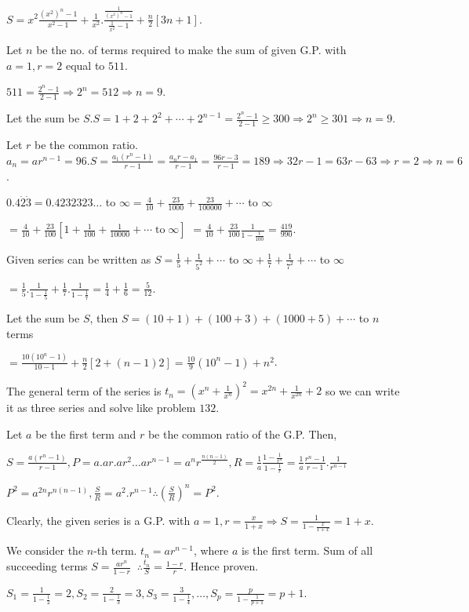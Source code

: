  $S = x^2\frac{(x^2)^n - 1}{x^2 - 1} + \frac{1}{x^2}.\frac{\frac{1}{(x^2)^n - 1}}{\frac{1}{x^2} - 1}
  + \frac{n}{2}[3n + 1]$.
\item Let $n$ be the no. of terms required to make the sum of given G.P. with $a = 1, r = 2$ equal to $511$.

  $511 = \frac{2^n - 1}{2 - 1} \Rightarrow 2^n = 512 \Rightarrow n = 9$.
\item Let the sum be $S. S = 1 + 2 + 2^2 + \cdots + 2^{n - 1} = \frac{2^n - 1}{2 - 1}\geq 300 \Rightarrow
  2^n\geq 301 \Rightarrow n = 9$.
\item Let $r$ be the common ratio. $a_n = ar^{n - 1} = 96. S = \frac{a_1(r^n - 1)}{r - 1} = \frac{a_nr -
  a_1}{r - 1} = \frac{96r - 3}{r - 1} = 189 \Rightarrow 32r - 1 = 63r - 63 \Rightarrow r = 2 \Rightarrow n =
  6$.
\item $0.4\dot{2}\dot{3} = 0.4232323\ldots$ to $\infty = \frac{4}{10} + \frac{23}{1000} + \frac{23}{100000}
  + \cdots$ to $\infty$

  $= \frac{4}{10} + \frac{23}{100}\left[1 + \frac{1}{100} + \frac{1}{10000} +
    \cdots\mathrm{\;to\;}\infty\right]$
  $= \frac{4}{10} + \frac{23}{100}\frac{1}{1 - \frac{1}{100}} = \frac{419}{990}$.
\item Given series can be written as $S = \frac{1}{5} + \frac{1}{5^2} + \cdots$ to $\infty + \frac{1}{7} +
  \frac{1}{7^2} + \cdots $ to $\infty$

  $= \frac{1}{5}.\frac{1}{1 - \frac{1}{5}} + \frac{1}{7}.\frac{1}{1 - \frac{1}{7}} = \frac{1}{4} +
  \frac{1}{6} = \frac{5}{12}$.
\item Let the sum be $S$, then $S = (10 + 1) + (100 + 3) + (1000 + 5) + \cdots$ to $n$ terms

  $= \frac{10(10^n - 1)}{10 - 1} + \frac{n}{2}[2 + (n - 1)2] = \frac{10}{9}(10^n - 1) + n^2$.
\item The general term of the series is $t_n = \left(x^n + \frac{1}{x^n}\right)^2 = x^{2n} +
  \frac{1}{x^{2n}} + 2$ so we can write it as three series and solve like problem $132$.
\item Let $a$ be the first term and $r$ be the common ratio of the G.P. Then,

  $S = \frac{a(r^n - 1)}{r - 1}, P = a.ar.ar^2\ldots ar^{n - 1} = a^nr^{\tfrac{n(n - 1)}{2}}, R =
  \frac{1}{a}\frac{1 - \frac{1}{r^n}}{1 - \frac{1}{r}} = \frac{1}{a}\frac{r^n - 1}{r - 1}.\frac{1}{r^{n -
  1}}$

  $P^2 = a^{2n}r^{n(n - 1)}, \frac{S}{R} = a^2.r^{n - 1}\therefore  \left(\frac{S}{R}\right)^n = P^2$.
\item Clearly, the given series is a G.P. with $a = 1, r = \frac{x}{1 + x} \Rightarrow S = \frac{1}{1 -
  \frac{x}{1 + x}} = 1 + x$.
\item We consider the $n$-th term. $t_n = ar^{n - 1}$, where $a$ is the first term. Sum of all succeeding
  terms $S = \frac{ar^n}{1 - r}\;\;\therefore \frac{t_n}{S} = \frac{1 - r}{r}$. Hence proven.
\item $S_1 = \frac{1}{1 - \frac{1}{2}} = 2, S_2 = \frac{2}{1 - \frac{1}{3}} = 3, S_3 = \frac{3}{1 -
  \frac{1}{4}}, \ldots, S_p = \frac{p}{1 - \frac{1}{p + 1}} = p + 1$.

